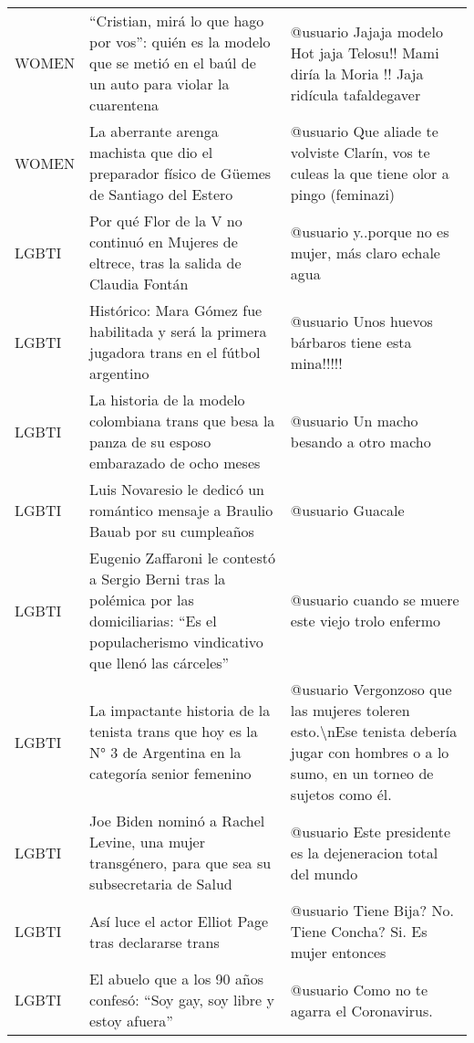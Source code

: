 \begin{table}
\begin{tabularx}{\textwidth}{l X X}
        WOMEN & “Cristian, mirá lo que hago por vos”: quién es la modelo que se metió en el baúl de un auto para violar la cuarentena & @usuario Jajaja modelo Hot jaja Telosu!! Mami diría la Moria !! Jaja ridícula tafaldegaver \\
        WOMEN & La aberrante arenga machista que dio el preparador físico de Güemes de Santiago del Estero & @usuario Que aliade te volviste Clarín, vos te culeas la que tiene olor a pingo (feminazi) \\
        \midrule
        LGBTI & Por qué Flor de la V no continuó en Mujeres de eltrece, tras la salida de Claudia Fontán & @usuario y..porque no es mujer, más claro echale agua \\
        LGBTI & Histórico: Mara Gómez fue habilitada y será la primera jugadora trans en el fútbol argentino & @usuario Unos huevos bárbaros tiene esta mina!!!!! \\
        LGBTI & La historia de la modelo colombiana trans que besa la panza de su esposo embarazado de ocho meses & @usuario Un macho besando a otro macho \\
        LGBTI & Luis Novaresio le dedicó un romántico mensaje a Braulio Bauab por su cumpleaños & @usuario Guacale \\
        LGBTI & Eugenio Zaffaroni le contestó a Sergio Berni tras la polémica por las domiciliarias: “Es el populacherismo vindicativo que llenó las cárceles” & @usuario cuando se muere este viejo trolo enfermo \\
        LGBTI & La impactante historia de la tenista trans que hoy es la N° 3 de Argentina en la categoría senior femenino & @usuario Vergonzoso que  las mujeres toleren esto.\textbackslash nEse tenista debería jugar con hombres o a lo sumo, en un torneo de sujetos como él. \\
        LGBTI & Joe Biden nominó a Rachel Levine, una mujer transgénero, para que sea su subsecretaria de Salud & @usuario Este presidente es la dejeneracion total del mundo \\
        LGBTI & Así luce el actor Elliot Page tras declararse trans & @usuario Tiene Bija? No. Tiene Concha? Si. Es mujer entonces \\
        LGBTI & El abuelo que a los 90 años confesó: “Soy gay, soy libre y estoy afuera” & @usuario Como no te agarra el Coronavirus.   🤮🤮 \\
    \end{tabularx}
\end{table}


